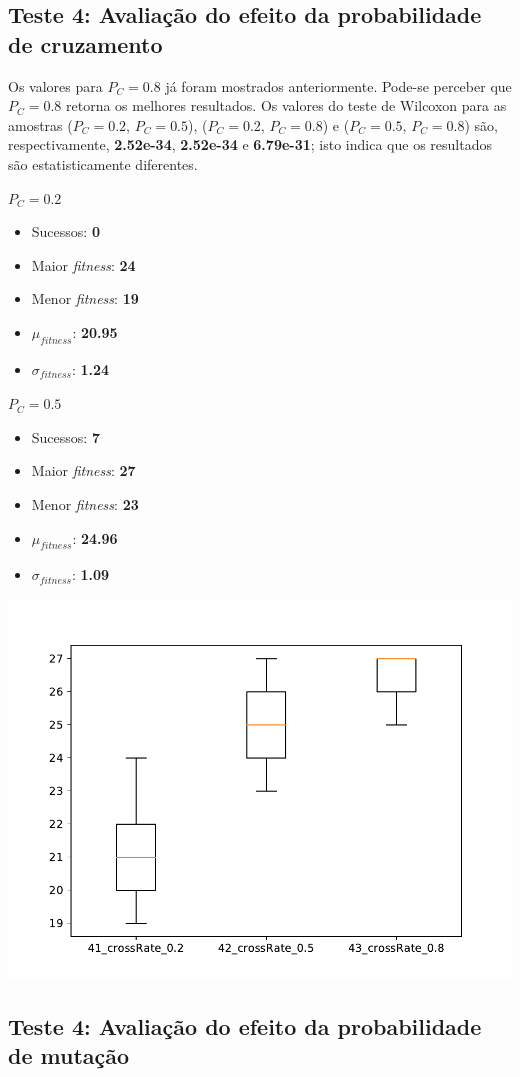 \documentclass[11pt,a4paper]{article}
\begin{document}
\subsection{Teste 4: Avaliação do efeito da probabilidade de cruzamento}
Os valores para $P_C=0.8$ já foram mostrados anteriormente. Pode-se perceber que $P_C=0.8$ retorna os melhores resultados. Os valores do teste de Wilcoxon para as amostras ($P_C=0.2$, $P_C=0.5$), ($P_C=0.2$, $P_C=0.8$) e ($P_C=0.5$, $P_C=0.8$) são, respectivamente, \textbf{2.52e-34}, \textbf{2.52e-34} e \textbf{6.79e-31}; isto indica que os resultados são estatisticamente diferentes.\\

\begin{minipage}{0.25\linewidth}
\textbf{$P_C=0.2$}
\begin{itemize}
	\footnotesize
	\setlength\itemsep{0em}
	\item Sucessos: \textbf{0}
	\item Maior \textit{fitness}: \textbf{24}
	\item Menor \textit{fitness}: \textbf{19}
	\item $\mu_{\textit{fitness}}$: \textbf{20.95}
	\item $\sigma_{\textit{fitness}}$: \textbf{1.24}
\end{itemize}
\end{minipage}
\begin{minipage}{0.25\linewidth}
\textbf{$P_C=0.5$}
\begin{itemize}
	\footnotesize
	\setlength\itemsep{0em}
	\item Sucessos: \textbf{7}
	\item Maior \textit{fitness}: \textbf{27}
	\item Menor \textit{fitness}: \textbf{23}
	\item $\mu_{\textit{fitness}}$: \textbf{24.96}
	\item $\sigma_{\textit{fitness}}$: \textbf{1.09}
\end{itemize}
\end{minipage}
\begin{minipage}{0.4\linewidth}
\begin{minipage}{0.4\linewidth}
\includegraphics[scale=0.5]{teste4.pdf}
\end{minipage}
\end{minipage}


\subsection{Teste 4: Avaliação do efeito da probabilidade de mutação}
\end{document}
